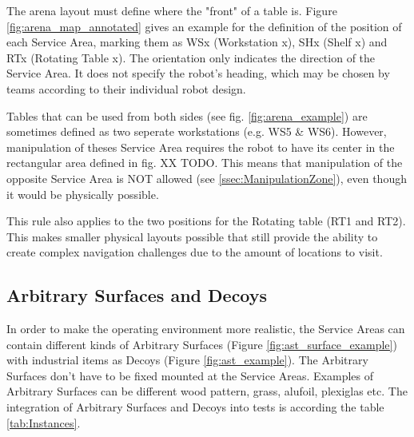 The arena layout must define where the "front" of a table is.
Figure \ref{fig:arena_map_annotated} gives an example for the definition of the position of each Service Area, marking them as WSx (Workstation x), SHx (Shelf x) and RTx (Rotating Table x). The orientation only indicates the direction of the Service Area. It does not specify the robot's heading, which may be chosen by teams according to their individual robot design.

Tables that can be used from both sides (see fig. \ref{fig:arena_example}) are sometimes defined as two seperate workstations (e.g. WS5 \& WS6). However, manipulation of theses Service Area requires the robot to have its center in the rectangular area defined in fig. XX TODO. This means that manipulation of the opposite Service Area is NOT allowed (see \ref{ssec:ManipulationZone}), even though it would be physically possible.

This rule also applies to the two positions for the Rotating table (RT1 and RT2).
This makes smaller physical layouts possible that still provide the ability to create complex navigation challenges due to the amount of locations to visit.


\subsection{Arbitrary Surfaces and Decoys}
\label{subsec:Arbitrary_Surfaces_and_Decoys}

In order to make the operating environment more realistic, the Service Areas can contain different kinds of Arbitrary Surfaces (Figure \ref{fig:ast_surface_example}) with industrial items as Decoys (Figure \ref{fig:ast_example}). The Arbitrary Surfaces don't have to be fixed mounted at the Service Areas. Examples of Arbitrary Surfaces can be different wood pattern, grass, alufoil, plexiglas etc. The integration of Arbitrary Surfaces and Decoys into tests is according the table \ref{tab:Instances}.

